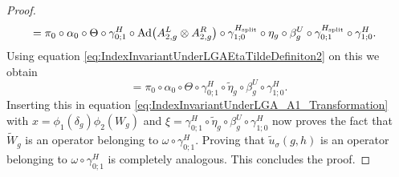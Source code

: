 \documentclass[12pt,a4paper,twoside]{article}
\let\originalleft\left
\let\originalright\right
\renewcommand{\left}{\mathopen{}\mathclose\bgroup\originalleft}
\renewcommand{\right}{\aftergroup\egroup\originalright}
\newcommand{\Ad}[1]{\textrm{Ad}\left(#1\right)}
\theoremstyle{definition}
\numberwithin{equation}{section}
\begin{document}
\begin{proof}
\begin{align}
		&=\pi_0\circ\alpha_0\circ\Theta\circ\gamma^{H}_{0;1}\circ\Ad{A_{2,g}^L\otimes A_{2,g}^R}\circ\gamma^{H_\text{split}}_{1;0}\circ\eta_g\circ\beta_g^U\circ\gamma^{H_\text{split}}_{0;1}\circ\gamma^H_{1;0}.
	\end{align}
	Using equation \eqref{eq:IndexInvariantUnderLGAEtaTildeDefiniton2} on this we obtain
	\begin{equation}
		=\pi_0\circ\alpha_0\circ\Theta\circ\gamma^H_{0;1}\circ\tilde{\eta}_g\circ\beta_g^U\circ\gamma^H_{1;0}.
	\end{equation}
	Inserting this in equation \eqref{eq:IndexInvariantUnderLGA_A1_Transformation} with $x=\phi_1(\delta_g)\phi_2(W_g)$ and $\xi=\gamma^H_{0;1}\circ\tilde{\eta}_g\circ\beta_g^U\circ\gamma^H_{1;0}$ now proves the fact that $\tilde{W}_g$ is an operator belonging to $\omega\circ\gamma^H_{0;1}$. Proving that $\tilde u_\sigma(g,h)$ is an operator belonging to $\omega\circ\gamma_{0;1}^H$ is completely analogous. This concludes the proof.
\end{proof}
\end{document}

